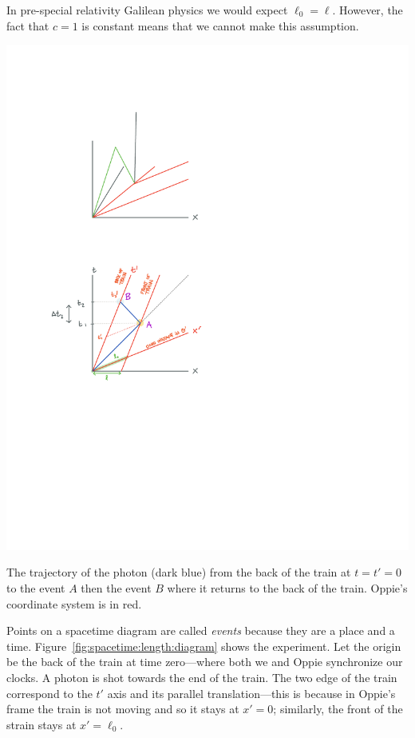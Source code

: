 \documentclass[12pt, oneside]{report}    %
\begin{document}
\begin{subappendices}
In pre-special relativity Galilean physics we would expect $\ell_0 = \ell$. However, the fact that $c=1$ is constant means that we cannot make this assumption. 
\begin{marginfigure}%
    \includegraphics[width=\textwidth]{figures/spacetime_lengthcontraction.pdf}
    \caption{The trajectory of the photon (dark blue) from the back of the train at $t=t'=0$ to the event $A$ then the event $B$ where it returns to the back of the train. Oppie's coordinate system is in red. \label{fig:spacetime:length:diagram}}
\end{marginfigure}
Points on a spacetime diagram are called \emph{events} because they are a place and a time. Figure~\ref{fig:spacetime:length:diagram} shows the experiment. Let the origin be the back of the train at time zero---where both we and Oppie synchronize our clocks. A photon is shot towards the end of the train. The two edge of the train correspond to the $t'$ axis and its parallel translation---this is because in Oppie's frame the train is not moving and so it stays at $x'=0$; similarly, the front of the strain stays at $x'=\ell_0$. 


\end{subappendices}
\end{document}
